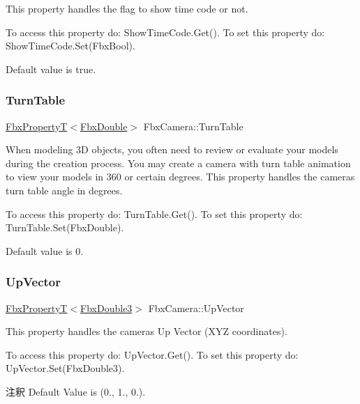 This property handles the flag to show time code or not.

To access this property do\+: Show\+Time\+Code.\+Get(). To set this property do\+: Show\+Time\+Code.\+Set(\+Fbx\+Bool).

Default value is true. \mbox{\label{class_fbx_camera_a927ab13d2fa91468ecb5373fdffd725a}} 
\subsubsection{\texorpdfstring{Turn\+Table}{TurnTable}}
{\footnotesize\ttfamily \hyperlink{class_fbx_property_t}{Fbx\+PropertyT}$<$\hyperlink{fbxtypes_8h_a171e72a1c46fc15c1a6c9c31948c1c5b}{Fbx\+Double}$>$ Fbx\+Camera\+::\+Turn\+Table}

When modeling 3D objects, you often need to review or evaluate your models during the creation process. You may create a camera with turn table animation to view your models in 360 or certain degrees. This property handles the camera\textquotesingle{}s turn table angle in degrees.

To access this property do\+: Turn\+Table.\+Get(). To set this property do\+: Turn\+Table.\+Set(\+Fbx\+Double).

Default value is 0. \mbox{\label{class_fbx_camera_ad2e9b17c1be832d71d4fc0eecc93732a}} 
\subsubsection{\texorpdfstring{Up\+Vector}{UpVector}}
{\footnotesize\ttfamily \hyperlink{class_fbx_property_t}{Fbx\+PropertyT}$<$\hyperlink{fbxtypes_8h_ae0a96f14cde566774c7553aa7523b7a7}{Fbx\+Double3}$>$ Fbx\+Camera\+::\+Up\+Vector}

This property handles the camera\textquotesingle{}s Up Vector (X\+YZ coordinates).

To access this property do\+: Up\+Vector.\+Get(). To set this property do\+: Up\+Vector.\+Set(\+Fbx\+Double3).

\begin{DoxyRemark}{注釈}
Default Value is (0., 1., 0.). 
\end{DoxyRemark}
\mbox{\label{class_fbx_camera_ad1e40e5371ba4003e8b21cfe0b8b42c7}} 
